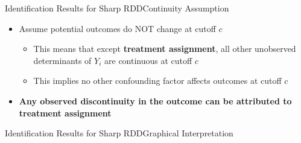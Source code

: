 \documentclass[hyperref={pdfpagelabels=false}]{beamer}
\begin{document}
\begin{frame}{Identification Results for Sharp RDD}{Continuity Assumption}
	\begin{itemize}
		
		\begin{block}{Continuity Assumption}
			$E[\mathrm{Y}^{1}_{i}|A_{i}]$ and $E[\mathrm{Y}^{0}_{i}|A_{i}]$ are continuous at $A_{i}=c$
		\end{block}
		\item Assume potential outcomes do NOT change at cutoff $c$
		\vspace{0.2cm}
		\begin{itemize}
			\item This means that except \textbf{treatment assignment}, all other unobserved determinants of $Y_{i}$ are continuous at cutoff $c$
			\vspace{0.2cm}
			\item This implies no other confounding factor affects outcomes at cutoff $c$
			\vspace{0.2cm}
		\end{itemize}
		\item \textbf{Any observed discontinuity in the outcome can be attributed to treatment assignment}
		
	\end{itemize}
\end{frame}









\begin{frame}{Identification Results for Sharp RDD}{Graphical Interpretation}
\end{frame}
\end{document}
